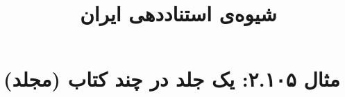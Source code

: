 \documentclass[a4paper,10pt]{article}
\begin{document}
\title{شیوه‌ی استناددهی ایران
 }
\author{}
\date{}
\maketitle



\section*{مثال ۲.۱۰۵: یک جلد در چند کتاب (مجلد)}

\cite{جم1385}\\
\cite{harley1994}\\






\end{document}
